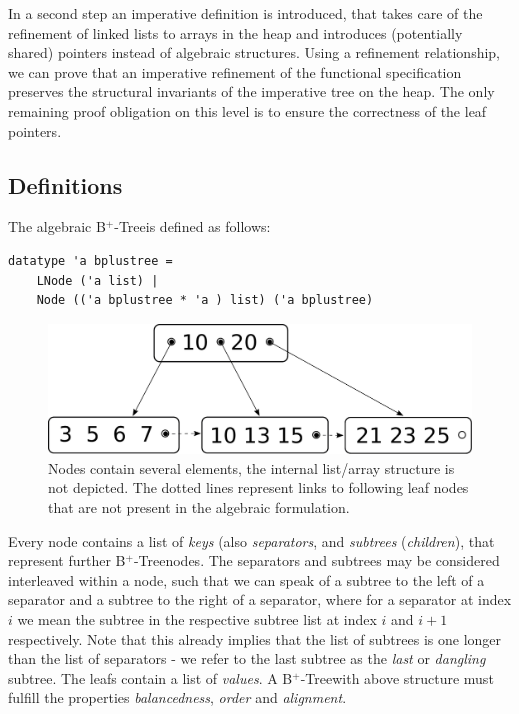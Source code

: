 \documentclass[a4paper,UKenglish,cleveref, autoref, thm-restate]{lipics-v2021}
\newcommand{\btree}{B$^+$-Tree}
\begin{document}
In a second step an imperative definition is introduced,
that takes care of the refinement of linked lists to arrays in the heap
and introduces (potentially shared) pointers instead of algebraic structures.
Using a refinement relationship, we can prove that an imperative refinement
of the functional specification preserves the structural invariants
of the imperative tree on the heap.
The only remaining proof obligation on this level is to ensure the correctness
of the leaf pointers.


\subsection{Definitions}
\label{sec:data_structure_defs}


The algebraic \btree is defined as follows:

\begin{lstlisting}[mathescape=true, language=Isabelle,label=lst:btree-def]
datatype 'a bplustree =
    LNode ('a list) |
    Node (('a bplustree * 'a ) list) ('a bplustree)
\end{lstlisting}


\begin{figure}
    \centering
    \includegraphics[width=0.5\linewidth]{btree-basic-nopair.pdf}
    \caption[Visualization of a \btree]
    {Nodes contain several elements, the internal list/array structure is not depicted.
    The dotted lines represent links to following leaf nodes that are not present in the algebraic formulation.}
    \label{fig:btree-basic}
\end{figure}


Every node contains a list of \textit{keys} (also \textit{separators}, and \textit{subtrees} (\textit{children}),
that represent further \btree nodes.
The separators and subtrees may be considered interleaved within a node,
such that we can speak of a subtree to the left of a separator and
a subtree to the right of a separator,
where for a separator at index $i$ we mean the subtree in the respective
subtree list at index $i$ and $i+1$ respectively.
Note that this already implies that the list of subtrees is one
longer than the list of separators - we refer to the last subtree
as the \textit{last} or \textit{dangling} subtree.
The leafs contain a list of \textit{values}.
A \btree with above structure must fulfill the properties
\textit{balancedness}, \textit{order} and \textit{alignment}.
\end{document}
